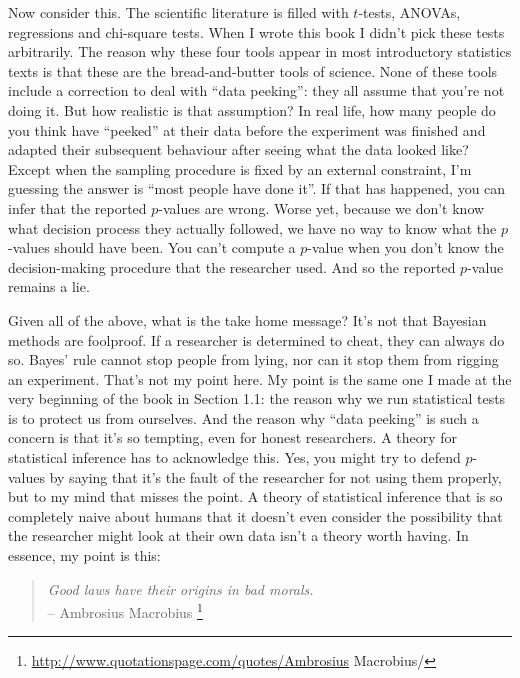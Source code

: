 \documentclass[
  a4paper,
]{book}
\begin{document}
Now consider this. The scientific literature is filled with \(t\)-tests,
ANOVAs, regressions and chi-square tests. When I wrote this book I
didn't pick these tests arbitrarily. The reason why these four tools
appear in most introductory statistics texts is that these are the
bread-and-butter tools of science. None of these tools include a
correction to deal with ``data peeking'': they all assume that you're
not doing it. But how realistic is that assumption? In real life, how
many people do you think have ``peeked'' at their data before the
experiment was finished and adapted their subsequent behaviour after
seeing what the data looked like? Except when the sampling procedure is
fixed by an external constraint, I'm guessing the answer is ``most
people have done it''. If that has happened, you can infer that the
reported \(p\)-values are wrong. Worse yet, because we don't know what
decision process they actually followed, we have no way to know what the
\(p\)-values should have been. You can't compute a \(p\)-value when you
don't know the decision-making procedure that the researcher used. And
so the reported \(p\)-value remains a lie.

Given all of the above, what is the take home message? It's not that
Bayesian methods are foolproof. If a researcher is determined to cheat,
they can always do so. Bayes' rule cannot stop people from lying, nor
can it stop them from rigging an experiment. That's not my point here.
My point is the same one I made at the very beginning of the book in
Section 1.1: the reason why we run statistical tests is to protect us
from ourselves. And the reason why ``data peeking'' is such a concern is
that it's so tempting, even for honest researchers. A theory for
statistical inference has to acknowledge this. Yes, you might try to
defend \(p\)-values by saying that it's the fault of the researcher for
not using them properly, but to my mind that misses the point. A theory
of statistical inference that is so completely naive about humans that
it doesn't even consider the possibility that the researcher might look
at their own data isn't a theory worth having. In essence, my point is
this:

\begin{quote}
\emph{Good laws have their origins in bad morals.}\\
-- Ambrosius Macrobius \footnote{\url{http://www.quotationspage.com/quotes/Ambrosius}
  Macrobius/}
\end{quote}
\end{document}
